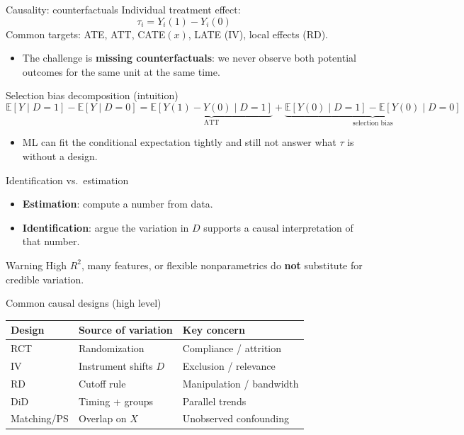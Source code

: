 \documentclass[aspectratio=169,11pt]{beamer}
\begin{document}
\begin{frame}{Causality: counterfactuals}
  Individual treatment effect:
  \[
    \tau_i = Y_i(1) - Y_i(0)
  \]
  Common targets: ATE, ATT, CATE\((x)\), LATE (IV), local effects (RD).
  \begin{itemize}
    \item The challenge is \textbf{missing counterfactuals}: we never observe both potential outcomes for the same unit at the same time.
  \end{itemize}
\end{frame}

\begin{frame}{Selection bias decomposition (intuition)}
  \[
    \mathbb{E}[Y \mid D{=}1] - \mathbb{E}[Y \mid D{=}0]
    =
    \underbrace{\mathbb{E}[Y(1){-}Y(0)\mid D{=}1]}_{\text{ATT}}
    +
    \underbrace{\mathbb{E}[Y(0)\mid D{=}1]{-}\mathbb{E}[Y(0)\mid D{=}0]}_{\text{selection bias}}
  \]
  \begin{itemize}
    \item ML can fit the conditional expectation tightly and still not answer what \(\tau\) is without a design.
  \end{itemize}
\end{frame}

\begin{frame}{Identification vs.\ estimation}
  \begin{itemize}
    \item \textbf{Estimation}: compute a number from data.
    \item \textbf{Identification}: argue the variation in \(D\) supports a causal interpretation of that number.
  \end{itemize}
  \vspace{0.3em}
  \begin{alertblock}{Warning}
    High \(R^2\), many features, or flexible nonparametrics do \textbf{not} substitute for credible variation.
  \end{alertblock}
\end{frame}

\begin{frame}{Common causal designs (high level)}
  \begin{center}
    \footnotesize
    \begin{tabular}{@{}p{}p{}p{}@{}}
      \toprule
      Design & Source of variation & Key concern \\
      \midrule
      RCT & Randomization & Compliance / attrition \\
      IV & Instrument shifts \(D\) & Exclusion / relevance \\
      RD & Cutoff rule & Manipulation / bandwidth \\
      DiD & Timing + groups & Parallel trends \\
      Matching/PS & Overlap on \(X\) & Unobserved confounding \\
      \bottomrule
    \end{tabular}
  \end{center}
\end{frame}
\end{document}
